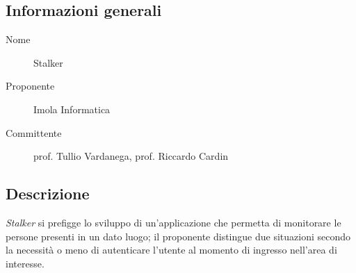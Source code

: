 \documentclass[../studio-di-fattibilita.tex]{subfiles}
\begin{document}
  \subsection{Informazioni generali}%
  \label{subsec:informazioni_generali}
  \begin{description}
    \item[Nome] Stalker
    \item[Proponente] Imola Informatica
    \item[Committente] prof. Tullio Vardanega, prof. Riccardo Cardin
  \end{description}


  \subsection{Descrizione}%
  \label{subsec:descrizione}
  \textit{Stalker} si prefigge lo sviluppo di un'applicazione che permetta di monitorare le persone presenti in un dato luogo; il proponente distingue due situazioni secondo la necessità o meno di autenticare l'utente al momento di ingresso nell'area di interesse.
\end{document}
